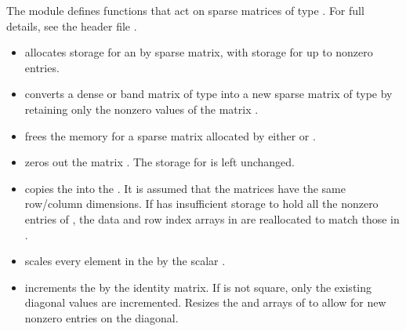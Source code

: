 The {\sls} module defines functions that act on sparse matrices of
type .  For full details, see the header file .
%
\begin{itemize}

\item {}
  \par {} allocates storage for an  by 
  sparse matrix, with storage for up to  nonzero entries.

\item {}
  \par {} converts a dense or band matrix  of type
   into a new sparse matrix of type  by retaining
  only the nonzero values of the matrix .

\item {}
  \par {} frees the memory for a sparse matrix
   allocated by either  or .

\item \ID{}
  \par {} zeros out the  matrix .
  The storage for  is left unchanged.

\item {}
  \par {} copies the   into the
   .  It is assumed that the matrices have the same
  row/column dimensions.  If  has insufficient storage to hold
  all the nonzero entries of , the data and row index arrays in
   are reallocated to match those in .

\item {}
  \par {} scales every element in the
    by the  scalar .

\item {}
  \par {} increments the  
  by the identity matrix.  If  is not square, only the existing
  diagonal values are incremented.  Resizes the  and
   arrays of  to allow for new 
  nonzero entries on the diagonal.


\end{itemize}
